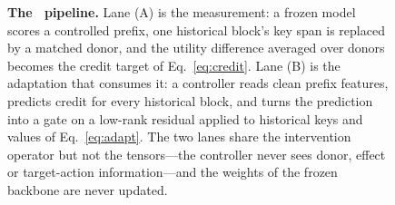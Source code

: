 \begin{figure}[tbp]
{%
}
\caption{\textbf{The \method\ pipeline.} Lane (A) is the measurement: a frozen
model scores a controlled prefix, one historical block's key span is replaced by
a matched donor, and the utility difference averaged over donors becomes the
credit target of Eq.~\eqref{eq:credit}. Lane (B) is the adaptation that consumes
it: a controller reads clean prefix features, predicts credit for every
historical block, and turns the prediction into a gate on a low-rank residual
applied to historical keys and values of Eq.~\eqref{eq:adapt}. The two lanes
share the intervention operator but not the tensors---the controller never sees
donor, effect or target-action information---and the weights of the frozen
backbone are never updated.}
\label{fig:pipeline}
\end{figure}
